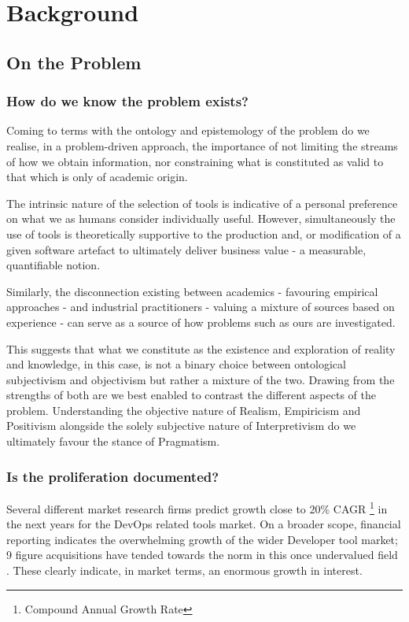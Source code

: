 \chapter{Background}

\section{On the Problem}

\subsection{How do we know the problem exists?}

Coming to terms with the ontology and epistemology of the problem do we realise, in a problem-driven approach, the importance of not limiting the streams of how we obtain information, nor constraining what is constituted as valid to that which is only of academic origin.

The intrinsic nature of the selection of tools is indicative of a personal preference on what we as humans consider individually useful. However, simultaneously the use of tools is theoretically supportive to the production and, or modification of a given software artefact to ultimately deliver business value - a measurable, quantifiable notion.

Similarly, the disconnection existing between academics - favouring empirical approaches - and industrial practitioners - valuing a mixture of sources based on experience - can serve as a source of how problems such as ours are investigated.

This suggests that what we constitute as the existence and exploration of reality and knowledge, in this case, is not a binary choice between ontological subjectivism and objectivism but rather a mixture of the two. Drawing from the strengths of both are we best enabled to contrast the different aspects of the problem. Understanding the objective nature of Realism, Empiricism and Positivism alongside the solely subjective nature of Interpretivism do we ultimately favour the stance of Pragmatism.

\subsection{Is the proliferation documented?}

Several different market research firms predict growth close to 20\% CAGR \footnote{Compound Annual Growth Rate} in the next years \parencite{techNavio} for the DevOps related tools market. On a broader scope, financial reporting indicates the overwhelming growth of the wider Developer tool market; 9 figure acquisitions have tended towards the norm in this once undervalued field \parencite{forbesDevToolsGrowth}. These clearly indicate, in market terms, an enormous growth in interest.

